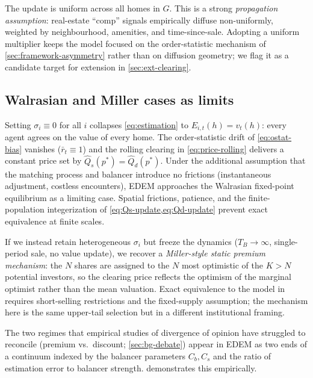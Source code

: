 The update is uniform across all homes in $G$. This is a strong
\emph{propagation assumption}: real-estate ``comp'' signals
empirically diffuse non-uniformly, weighted by neighbourhood,
amenities, and time-since-sale. Adopting a uniform multiplier keeps
the model focused on the order-statistic mechanism of
\cref{sec:framework-asymmetry} rather than on diffusion geometry; we
flag it as a candidate target for extension in \cref{sec:ext-clearing}.

\subsection{Walrasian and Miller cases as limits}
\label{sec:framework-walras-miller}

Setting $\sigma_{i} \equiv 0$ for all $i$ collapses
\cref{eq:estimation} to $E_{i,t}(h) = v_{t}(h)$: every agent agrees
on the value of every home. The order-statistic drift of
\cref{eq:ostat-bias} vanishes ($\bar{r}_{t} \equiv 1$) and the
rolling clearing in \cref{eq:price-rolling} delivers a constant
price set by $\hat{Q}_{s}(p^{*}) = \hat{Q}_{d}(p^{*})$. Under the
additional assumption that the matching process and balancer
introduce no frictions (instantaneous adjustment, costless
encounters), EDEM approaches the Walrasian fixed-point equilibrium
as a limiting case. Spatial frictions, patience, and the
finite-population integerization of \cref{eq:Qs-update,eq:Qd-update}
prevent exact equivalence at finite scales.

If we instead retain heterogeneous $\sigma_{i}$ but freeze the
dynamics ($T_{B} \to \infty$, single-period sale, no value update),
we recover a \emph{Miller-style static premium mechanism}: the
$N$ shares are assigned to the $N$ most optimistic of the
$K > N$ potential investors, so the clearing price reflects the
optimism of the marginal optimist rather than the mean valuation.
Exact equivalence to the model in \citet{miller1977} requires
short-selling restrictions and the fixed-supply assumption; the
mechanism here is the same upper-tail selection but in a different
institutional framing.

The two regimes that empirical studies of divergence of opinion have
struggled to reconcile (premium vs.\ discount;
\cref{sec:bg-debate}) appear in EDEM as two ends of a continuum
indexed by the balancer parameters $C_{b}, C_{s}$ and the
ratio of estimation error to balancer strength. 
demonstrates this empirically.
